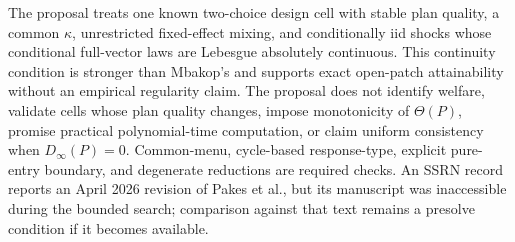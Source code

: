 \documentclass{article}
\begin{document}
The proposal treats one known two-choice design cell with stable plan quality, a common \(\kappa\), unrestricted fixed-effect mixing, and conditionally iid shocks whose conditional full-vector laws are Lebesgue absolutely continuous. This continuity condition is stronger than Mbakop's and supports exact open-patch attainability without an empirical regularity claim. The proposal does not identify welfare, validate cells whose plan quality changes, impose monotonicity of \(\Theta(P)\), promise practical polynomial-time computation, or claim uniform consistency when \(D_\infty(P)=0\). Common-menu, cycle-based response-type, explicit pure-entry boundary, and degenerate reductions are required checks. An SSRN record reports an April 2026 revision of Pakes et al., but its manuscript was inaccessible during the bounded search; comparison against that text remains a presolve condition if it becomes available.
\end{document}
